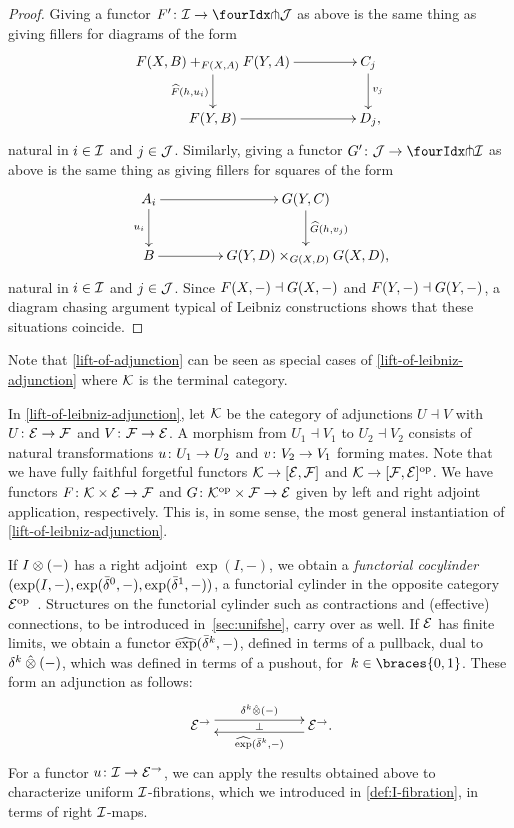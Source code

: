 \documentclass[reqno,10pt,a4paper,oneside,draft]{amsart}
\begin{document}
\begin{proof}
Giving a functor $F' \co \cal{I} \to \liftl{\cal{J}}$ as above is the same thing as giving fillers for diagrams of the form
\[
\xymatrix@C+2em{
  F(X,B) +_{F(X,A)} F(Y,A)
  \ar[d]_{\widehat{F}(h, u_i)}
  \ar[r]
&
  C_j
  \ar[d]^{v_j}
\\
  F(Y, B)
  \ar[r]
&
  D_j
\rlap{,}}
\]
natural in $i \in \cal{I}$ and $j \in \cal{J}$.
Similarly, giving a functor $G' \co \cal{J} \to \liftl{\cal{I}}$ as above is the same thing as giving fillers for squares of the form
\[
\xymatrix@C+2em{
  A_i
  \ar[d]_{u_i}
  \ar[r]
&
  G(Y, C)
  \ar[d]^{\widehat{G}(h, v_j)}
\\
  B
  \ar[r]
&
  G(Y, D) \times_{G(X,D)} G(X, D)
\rlap{,}}
\]
natural in $i \in \cal{I}$ and $j \in \cal{J}$.
Since $F(X, \arghole) \dashv G(X, \arghole)$ and $F(Y, \arghole) \dashv G(Y, \arghole)$, a diagram chasing argument typical of Leibniz constructions shows that these situations coincide.
\end{proof}

Note that \cref{lift-of-adjunction} can be seen as special cases of \cref{lift-of-leibniz-adjunction} where $\cal{K}$ is the terminal category.

\begin{remark} \label{pitchfork-leibniz-most-general-example}
In \cref{lift-of-leibniz-adjunction}, let $\cal{K}$ be the category of adjunctions $U \dashv V$ with $U \co \catE \to \cal{F}$ and $V \co \cal{F} \to \catE$.
A morphism from $U_1 \dashv V_1$ to $U_2 \dashv V_2$ consists of natural transformations $u \co U_1 \to U_2$ and $v \co V_2 \to V_1$ forming mates.
Note that we have fully faithful forgetful functors $\cal{K} \to [\catE, \cal{F}]$ and $\cal{K} \to [\cal{F}, \catE]^{\op}$.
We have functors $F \co \cal{K} \times \catE \to \cal{F}$ and $G \co \cal{K}^{\op} \times \cal{F} \to \catE$ given by left and right adjoint application, respectively.
This is, in some sense, the most general instantiation of \cref{lift-of-leibniz-adjunction}.
\end{remark}

If $\interval \otimes (-)$ has a right adjoint $\exp(I, -)$, we obtain a \emph{functorial cocylinder} $(\exp(\interval, -), \exp(\bar{\delta}^0, -), \exp(\bar{\delta}^1, -))$, \ie a functorial cylinder in the opposite category $\catE^{\op}$~\cite{kamps-porter:homotopy}.
Structures on the functorial cylinder such as contractions and (effective) connections, to
be introduced in~\cref{sec:unifshe}, carry over as well.
If $\calE$ has finite limits, we obtain a functor $\hatexp(\bar{\delta}^k, -)$, defined in terms of a pullback, dual to $\kcyl \hatotimes (-)$, which was defined in terms of a pushout, for~$k \in \braces{0, 1}$.
These form an adjunction as follows:
\[
\xymatrix@C+4em{
  \catE^\to
  \ar@<1ex>[r]^{\kcyl \hatotimes (-)}
  \ar@{}[r]|{\bot}
&
  \catE^\to
  \ar@<1ex>[l]^{\hatexp(\bar{\delta}^k, -)}
\rlap{.}}
\]
For a functor $u \co \cal{I} \to \catE^\to$, we can apply the results obtained above to characterize uniform $\cal{I}$-fibrations, which we introduced in \cref{def:I-fibration}, in terms of right $\cal{I}$-maps.
\end{document}
